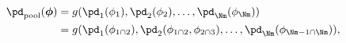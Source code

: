 \begin{align}
  \pd_{\text{pool}}(\boldsymbol{\phi}) &= g(\pd_{1}(\phi_{1}), \pd_{2}(\phi_{2}), \ldots, \pd_{\Nm}(\phi_{\Nm})) \\
  &= g(\pd_{1}(\phi_{1 \cap 2}), \pd_{2}(\phi_{1 \cap 2}, \phi_{2 \cap 3}), \ldots, \pd_{\Nm}(\phi_{\Nm - 1 \cap \Nm})),
  \label{eqn:pooled-prior-general-def}
\end{align}